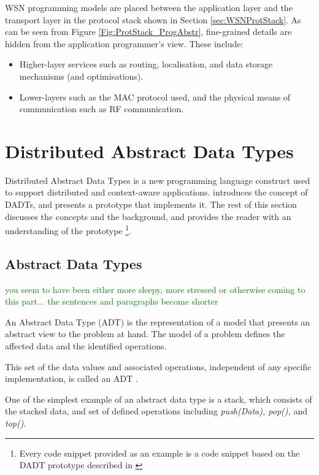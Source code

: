 WSN programming models are placed between the application layer and the
transport layer in the
protocol stack shown in Section \ref{sec:WSNProtStack}. As can be seen from
Figure \ref{Fig:ProtStack_ProgAbstr},
fine-grained details are hidden from the application programmer's view. These
include:

\begin{itemize}
  \item Higher-layer services such as routing, localisation, and data storage
  mechanisms (and optimisations).
  \item Lower-layers such as the MAC protocol used, and the physical means of
  communication such as RF communication.
\end{itemize}


\section {Distributed Abstract Data Types} \label{sec:DADT}

Distributed Abstract Data Types is a new programming language construct used to
support distributed and context-aware applications. \cite{migliavacca_DADT:2006}
introduces the concept of DADTs, and presents a prototype that implements it.
The rest of this section discusses the concepts and the background, and
provides the reader with an understanding of the prototype \footnote{Every code snippet provided as an example is a code snippet based on
the DADT prototype described in \cite{migliavacca_DADT:2006}}.

\subsection{Abstract Data Types}

\textcolor{green}{you seem to have been either more sleepy, more stressed or otherwise coming to this part...
the sentences and paragraphs become shorter}

An Abstract Data Type (ADT) is the representation of a model that presents an
abstract view to the problem at hand. The model of a problem defines the
affected data and the identified operations.

This set of the data values and associated operations, independent of any
specific implementation, is called an ADT \cite{NIST_website}. 

One of the simplest example of an abstract data type is a stack, which
consists of the stacked data, and set of defined operations including \emph{push(Data), pop(),}
and \emph{top()}.

